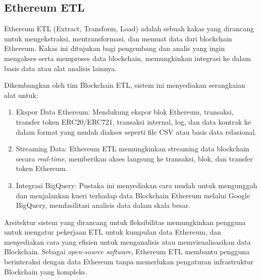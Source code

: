 \subsection{Ethereum ETL}
\label{subsec:ethereum-etl}

Ethereum ETL (Extract, Transform, Load) adalah sebuah kakas yang dirancang untuk mengekstraksi, mentransformasi, dan memuat data dari blockchain Ethereum. Kakas ini ditujukan bagi pengembang dan analis yang ingin mengakses serta memproses data blockchain, memungkinkan integrasi ke dalam basis data atau alat analisis lainnya. 

Dikembangkan oleh tim Blockchain ETL, sistem ini menyediakan serangkaian alat untuk:

\begin{enumerate}
  \item Ekspor Data Ethereum: Mendukung ekspor blok Ethereum, transaksi, transfer token ERC20/ERC721, transaksi internal, log, dan data kontrak ke dalam format yang mudah diakses seperti file CSV atau basis data relasional.
  \item Streaming Data: Ethereum ETL memungkinkan streaming data blockchain secara \textit{real-time}, memberikan akses langsung ke transaksi, blok, dan transfer token Ethereum.
  \item Integrasi BigQuery: Pustaka ini menyediakan cara mudah untuk mengunggah dan menjalankan kueri terhadap data Blockchain Ethereum melalui Google BigQuery, memfasilitasi analisis data dalam skala besar.
\end{enumerate}

Arsitektur sistem yang dirancang untuk fleksibilitas memungkinkan pengguna untuk mengatur pekerjaan ETL untuk kumpulan data Ethereum, dan menyediakan cara yang efisien untuk menganalisis atau memvisualisasikan data Blockchain. Sebagai \textit{open-source software}, Ethereum ETL membantu pengguna berinteraksi dengan data Ethereum tanpa memerlukan pengaturan infrastruktur Blockchain yang kompleks. \parencite{ethereum_etl}